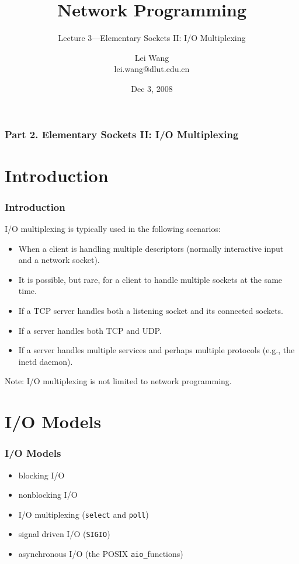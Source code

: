 \documentclass[notes,serif]{beamer}
\title{Network Programming}
\subtitle{Lecture 3---Elementary Sockets II: I/O Multiplexing}
\author{Lei Wang\\ lei.wang@dlut.edu.cn}
\institute{Dalian University of Technology}
\date{Dec 3, 2008}
\begin{document}
\begin{frame}
  \titlepage
\end{frame}

\begin{frame}
  \frametitle{Part 2. Elementary Sockets II: I/O Multiplexing}
  \tableofcontents
\end{frame}

\section{Introduction}

\begin{frame}
\frametitle{Introduction}

I/O multiplexing is typically used in the following scenarios:
\begin{itemize}
  \item When a client is handling multiple descriptors (normally interactive input and a network socket).
  \item It is possible, but rare, for a client to handle multiple sockets at the same time.
  \item If a TCP server handles both a listening socket and its connected sockets.
  \item If a server handles both TCP and UDP.
  \item If a server handles multiple services and perhaps multiple protocols (e.g., the inetd daemon).
\end{itemize}
Note: I/O multiplexing is not limited to network programming.
\end{frame}

\section{I/O Models}
\begin{frame}
\frametitle{I/O Models}
\begin{itemize}
  \item blocking I/O
  \item nonblocking I/O
  \item I/O multiplexing (\texttt{select} and \texttt{poll})
  \item signal driven I/O (\texttt{SIGIO})
  \item asynchronous I/O (the POSIX \texttt{aio\_}functions)
\end{itemize}
\end{frame}
\end{document}
